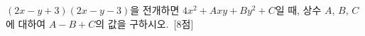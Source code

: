 $(2x-y+3)(2x-y-3)$을 전개하면 $4x^2+Axy+By^2+C$일 때, 상수 $A$, $B$, $C$에 대하여 $A-B+C$의 값을 구하시오.~\mbox{\mbox{[8점]}}
